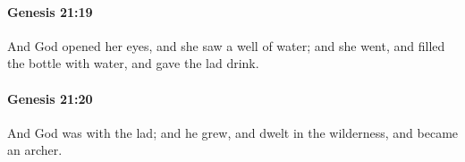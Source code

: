 		\paragraph{Genesis 21:19} %
			\label{GENESIS-21-19}

			And God opened her eyes, and she saw a well of water; and she went, and filled the bottle with water, and gave the lad drink.


		\paragraph{Genesis 21:20} %
			\label{GENESIS-21-20}

			And God was with the lad; and he grew, and dwelt in the wilderness, and became an archer.


